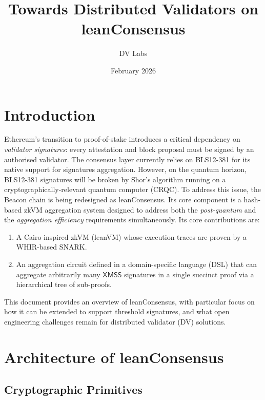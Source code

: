 \documentclass[11pt,a4paper]{article}
\title{%
  \textbf{Towards Distributed Validators on leanConsensus}\\[4pt]
}
\author{%
DV Labs
}
\date{February 2026}
\newcommand{\bls}{\textsf{BLS12-381}\xspace}
\newcommand{\XMSS}{\textsf{XMSS}\xspace}
\newcommand{\WHIR}{\textsf{WHIR}\xspace}
\newcommand{\leanVM}{\textsf{leanVM}\xspace}
\newcommand{\leanConsensus}{\textsf{leanConsensus}\xspace}
\begin{document}
\maketitle

\section{Introduction}
\label{sec:intro}

Ethereum's transition to proof-of-stake introduces a critical dependency on \emph{validator signatures}: every attestation and block proposal must be signed by an authorised validator.
The consensus layer currently relies on \bls for its native support for signatures aggregation.
However, on the quantum horizon, \bls signatures will be broken by Shor's algorithm running on a cryptographically-relevant quantum computer (CRQC).
To address this issue, the Beacon chain is being redesigned as \leanConsensus. Its core component is a hash-based zkVM aggregation system designed to address both the \emph{post-quantum} and the \emph{aggregation efficiency} requirements simultaneously. Its core contributions are:
\begin{enumerate}[label=(\roman*)]
  \item A Cairo-inspired zkVM (\leanVM) whose execution traces are proven by a \WHIR-based SNARK.
  \item An aggregation circuit defined in a domain-specific language (DSL) that can aggregate arbitrarily many $\XMSS$ signatures in a single succinct proof via a hierarchical tree of sub-proofs.
\end{enumerate}
This document provides an overview of \leanConsensus, with particular focus on how it can be extended to support threshold signatures, and what open engineering challenges remain for distributed validator (DV) solutions.

\section{Architecture of leanConsensus}
\label{sec:architecture}

\subsection{Cryptographic Primitives}
\label{subsec:primitives}
\end{document}
